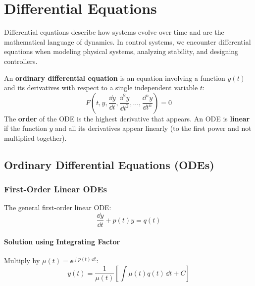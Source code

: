 \chapter{Differential Equations}
\label{ch:diff_eq}

Differential equations describe how systems evolve over time and are the mathematical language of dynamics. In control systems, we encounter differential equations when modeling physical systems, analyzing stability, and designing controllers.

\begin{definitionbox}[title=Definition: Ordinary Differential Equation (ODE)]
An \textbf{ordinary differential equation} is an equation involving a function $y(t)$ and its derivatives with respect to a single independent variable $t$:
\begin{equation}
F\left(t, y, \frac{\dd y}{\dd t}, \frac{\dd^2 y}{\dd t^2}, \ldots, \frac{\dd^n y}{\dd t^n}\right) = 0
\end{equation}
The \textbf{order} of the ODE is the highest derivative that appears. An ODE is \textbf{linear} if the function $y$ and all its derivatives appear linearly (to the first power and not multiplied together).
\end{definitionbox}

\section{Ordinary Differential Equations (ODEs)}

\subsection{First-Order Linear ODEs}

The general first-order linear ODE:
\begin{equation}
\frac{\dd y}{\dd t} + p(t) y = q(t)
\end{equation}

\subsubsection{Solution using Integrating Factor}
Multiply by $\mu(t) = \ee^{\int p(t) \, \dd t}$:
\begin{equation}
y(t) = \frac{1}{\mu(t)} \left[ \int \mu(t) q(t) \, \dd t + C \right]
\end{equation}

